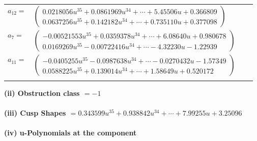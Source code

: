 \documentclass[1p]{elsarticle_modified}
\theoremstyle{definition}
\begin{document}
\begin{tabular}{m{7pt} m{180pt} m{7pt} m{180pt} }
\flushright $a_{12}=$&$\begin{pmatrix}0.0218056 u^{35}+0.0861969 u^{34}+\cdots+5.45506 u+0.366809\\0.0637256 u^{35}+0.142182 u^{34}+\cdots+0.735110 u+0.377098\end{pmatrix}$ \\
\flushright $a_{7}=$&$\begin{pmatrix}-0.00521553 u^{35}+0.0359378 u^{34}+\cdots+6.08640 u+0.980678\\0.0169269 u^{35}-0.00722416 u^{34}+\cdots-4.32230 u-1.22939\end{pmatrix}$ \\
\flushright $a_{11}=$&$\begin{pmatrix}-0.0405255 u^{35}-0.0987638 u^{34}+\cdots-0.0270432 u-1.57349\\0.0588225 u^{35}+0.139014 u^{34}+\cdots+1.58649 u+0.520172\end{pmatrix}$\\&\end{tabular}
\flushleft \textbf{(ii) Obstruction class $= -1$}\\~\\
\flushleft \textbf{(iii) Cusp Shapes $= 0.343599 u^{35}+0.938842 u^{34}+\cdots+7.99255 u+3.25096$}\\~\\
\newpage\renewcommand{\arraystretch}{1}
\flushleft \textbf{(iv) u-Polynomials at the component}\newline \\
\end{document}
